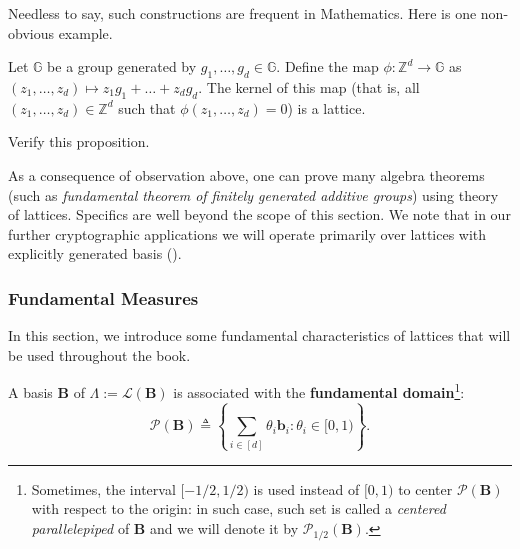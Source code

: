 \documentclass[../../book.tex]{subfiles}
\begin{document}
Needless to say, such constructions are frequent in Mathematics. Here is one non-obvious example.

\begin{proposition}
    Let $\mathbb{G}$ be a group generated by $g_1,\dots,g_d \in \mathbb{G}$.
    Define the map $\phi: \mathbb{Z}^d \to \mathbb{G}$ as $(z_1,\dots,z_d) \mapsto z_1g_1 + \dots + z_dg_d$.
    The kernel of this map (that is, all $(z_1,\dots,z_d) \in \mathbb{Z}^d$ such that $\phi(z_1,\dots,z_d) = 0$) is a lattice.
\end{proposition}

\begin{exercise}
    Verify this proposition.
\end{exercise}

As a consequence of observation above, one can prove many algebra theorems (such as \emph{fundamental theorem of finitely generated additive groups}) using theory of lattices.
Specifics are well beyond the scope of this section.
We note that in our further cryptographic applications we will operate primarily over lattices with explicitly generated basis ().

\subsubsection{Fundamental Measures}

In this section, we introduce some fundamental characteristics of lattices that will be used throughout the book.

A basis $\mathbf{B}$ of $\Lambda := \mathcal{L}(\mathbf{B})$ is associated with the \textbf{fundamental
domain}\footnote{Sometimes, the interval $[-1/2, 1/2)$ is used
instead of $[0,1)$ to center $\mathcal{P}(\mathbf{B})$ with respect to the origin: in such
case, such set is called a \textit{centered parallelepiped} of $\mathbf{B}$ and we will denote it by $\mathcal{P}_{1/2}(\mathbf{B})$.}:
\begin{equation*}
    \mathcal{P}(\mathbf{B}) \triangleq \left\{ \sum_{i \in [d]} \theta_i\mathbf{b}_i: \theta_i \in [0,1) \right\}.
\end{equation*}
\end{document}
